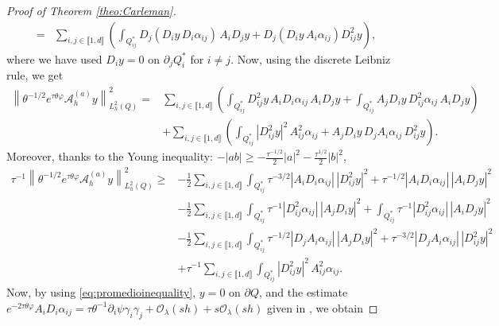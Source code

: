 \documentclass{amsart}
\numberwithin{equation}{section}
\begin{document}
\begin{proof}[Proof of Theorem \ref{theo:Carleman}]
\begin{equation*}
\begin{aligned}
        =&\sum_{i,j\in\llbracket 1,d\rrbracket}\left(\int_{Q_{ij}^{\ast}} D_{j}(D_{i}y\,D_{i}\alpha_{ij}) \,A_{i}D_{j}y+D_{j}(D_{i}y\,A_{i}\alpha_{ij}) D^{2}_{ij}y\right),
           \end{aligned}
\end{equation*}
where we have used $D_{i}y=0$ on $\partial_{j}Q_{i}^{\ast}$ for $i\ne j$. Now, using the discrete Leibniz rule, we get
\begin{equation}
    \begin{aligned}
    \left\|\theta^{-1/2}e^{\tau\theta\varphi}\mathcal{A}_{h}^{(a)}y\right\|^{2}_{L_{h}^{2}(Q)}=&\sum_{i,j\in\llbracket 1,d\rrbracket}\left(\int_{Q_{ij}^{\ast}} D^{2}_{ij}y\,A_{i}D_{i}\alpha_{ij} \,A_{i}D_{j}y+\int_{Q_{ij}^{\ast}} A_{j}D_{i}y\,D^{2}_{ij}\alpha_{ij} \,A_{i}D_{j}y\right)\\
        &+\sum_{i,j\in\llbracket 1,d\rrbracket}\left(\int_{Q_{ij}^{\ast}} |D^{2}_{ij}y|^{2}\,A_{ij}^{2}\alpha_{ij} +A_{j}D_{i}y\,D_{j}A_{i}\alpha_{ij}\, D_{ij}^{2}y\right).
           \end{aligned}
\end{equation}
Moreover, thanks to the Young inequality: $-|ab|\ge-\frac{\tau^{-1/2}}{2}|a|^2-\frac{\tau^{1/2}}{2}|b|^2$,
\begin{equation}\label{ine:A:a}
    \begin{aligned}
    \tau^{-1}\left\|\theta^{-1/2}e^{\tau\theta\varphi}\mathcal{A}_{h}^{(a)}y\right\|^{2}_{L_{h}^{2}(Q)}\geq &-\frac{1}{2}\sum_{i,j\in\llbracket 1,d\rrbracket}\int_{Q_{ij}^{\ast}} \tau^{-3/2}|A_{i}D_{i}\alpha_{ij}|\,|D_{ij}^{2}y|^{2}+\tau^{-1/2}|A_{i}D_{i}\alpha_{ij}|\,|A_{i}D_{j}y|^{2}\\
    &-\frac{1}{2}\sum_{i,j\in\llbracket 1,d\rrbracket}\int_{Q_{ij}^{\ast}} \tau^{-1}|D^{2}_{ij}\alpha_{ij}|\,|A_{j}D_{i}y|^{2}+\int_{Q_{ij}^{\ast}} \tau^{-1}|D^{2}_{ij}\alpha_{ij}| \,|A_{i}D_{j}y|^{2}\\
        &-\frac{1}{2}\sum_{i,j\in\llbracket 1,d\rrbracket}\int_{Q_{ij}^{\ast}} \tau^{-1/2}|D_{j}A_{i}\alpha_{ij}|\,|A_{j}D_{i}y|^{2}+\tau^{-3/2}|D_{j}A_{i}\alpha_{ij}|\,| D_{ij}^{2}y|^{2}\\
        &+\tau^{-1}\sum_{i,j\in\llbracket 1,d\rrbracket}\int_{Q_{ij}^{\ast}} |D^{2}_{ij}y|^{2}\,A_{ij}^{2}\alpha_{ij}.
           \end{aligned}
\end{equation}
Now, by using \eqref{eq:promedioinequality}, $y=0$ on $\partial Q$, and the estimate $e^{-2\tau\theta\varphi}A_{i}D_{i}\alpha_{ij}=\tau\theta^{-1}\partial_{i}\psi \gamma_{i}\gamma_{j}+\mathcal{O}_{\lambda}(sh)+s\mathcal{O}_{\lambda}(sh)$ given in \cite[Theorem 3.5]{AA:perez:2024}, we obtain

\end{proof}
\end{document}
